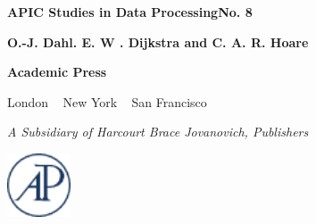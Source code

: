 \pagecolor{desertstorm}\afterpage{\nopagecolor}
{
	\color{shadesofmidnight}
	\selectfont
	\textbf{APIC Studies in Data Processing}\quad \textbf{No. 8}
	\vspace*{3em}
	
	\medskip
	
	\vspace*{3em}
	
	{
		\large
		\textbf{O.-J. Dahl. E. W . Dijkstra and C. A. R. Hoare}
	}
	
	\vfill
	
	 \begin{minipage}[position]{9cm}
	 	\vspace{-3em}
	 	
	 	\bfseries\large Academic Press
	 	
	 	London ~ New York ~ San Francisco
	 	
	 	\normalfont{}\selectfont\footnotesize
	 	\textit{A Subsidiary of Harcourt Brace Jovanovich, Publishers}
	\end{minipage}
	\hfill\includegraphics[width=0.14\textwidth]{./images/academic-press-blue}
}
